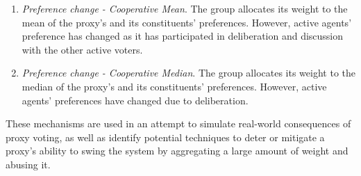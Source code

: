 \begin{enumerate}
{        Note this is analogous to only having the active agents vote.  
    }
    \item {
        \textit{Preference change - Cooperative Mean}.
        The group allocates its weight to the mean of the proxy's and its
        constituents' preferences.
        However, active agents' preference has changed as it has participated in
        deliberation and discussion with the other active voters.
        
    }
    \item {
        \textit{Preference change - Cooperative Median}.
        The group allocates its weight to the median of the proxy's and its
        constituents' preferences.
        However, active agents' preferences have changed due to deliberation.
    }
\end{enumerate}
These mechanisms are used in an attempt to simulate real-world consequences of proxy
voting, as well as identify potential techniques to deter or mitigate a proxy's
ability to swing the system by aggregating a large amount of weight and abusing it.
